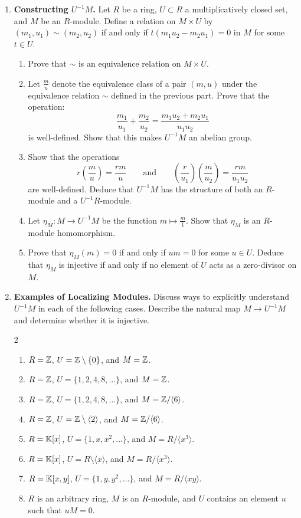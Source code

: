 \documentclass[12pt,reqno]{amsart}
\begin{document}
\begin{enumerate}[leftmargin=*,resume]

\item \textbf{Constructing $U^{-1}M$.} Let $R$ be a ring, $U \subset R$ a multiplicatively closed set, and $M$ be an $R$-module. Define a relation on $M\times U$ by $(m_{1},u_{1}) \sim (m_{2},u_{2})$ if and only if $t(m_1u_{2}-m_{2}u_{1})=0$ in $M$ for some $t\in U$. 
\begin{enumerate}
	\item Prove that $\sim$ is an equivalence relation on $M\times U$. 
	\item Let $\frac{m}{u}$ denote the equivalence class of a pair $(m,u)$ under the equivalence relation $\sim$ defined in the previous part. Prove that the operation:
	\[
\frac{m_1}{u_1}+\frac{m_2}{u_2} = \frac{m_1u_{2}+m_{2}u_{1}}{u_1u_2}
\]
	is well-defined. Show that this makes $U^{-1}M$ an abelian group.
	\item Show that the operations 
	\[
	r \left(\frac{m}{u}\right)=\frac{rm}{u} \quad \quad \text{and} \quad \quad \left(\frac{r}{u_1}\right)\left(\frac{m}{u_2}\right)=\frac{rm}{u_1u_2} 
	\]
	are well-defined. Deduce that $U^{-1}M$ has the structure of both an $R$-module and a $U^{-1}R$-module.
	\item Let $\eta_M:M\to U^{-1}M$ be the function $m\mapsto \frac{m}{1}$. Show that $\eta_M$ is an $R$-module homomorphism. 
	\item Prove that $\eta_M(m)=0$ if and only if $um=0$ for some $u\in U$. Deduce that $\eta_M$ is injective if and only if no element of $U$ acts as a zero-divisor on $M$.
\end{enumerate}

\item \textbf{Examples of Localizing Modules.} Discuss ways to explicitly understand $U^{-1}M$ in each of the following cases. Describe the natural map $M\to U^{-1}M$ and determine whether it is injective.
\begin{multicols}{2}
\begin{enumerate}
	\item $R=\mathbb{Z}$, $U=\mathbb{Z}\setminus\{0\}$, and $M=\mathbb{Z}$.
	\item $R=\mathbb{Z}$, $U=\{1,2,4,8,\ldots\}$, and $M=\mathbb{Z}$.
	\item $R=\mathbb{Z}$, $U=\{1,2,4,8,\ldots\}$, and $M=\mathbb{Z}/\langle 6\rangle$.
	\item $R=\mathbb{Z}$, $U=\mathbb{Z}\setminus \langle 2\rangle$, and $M=\mathbb{Z}/\langle 6\rangle$.
	\item $R=\mathbb{K}[x]$, $U=\{1,x,x^2,\ldots\}$, and $M=R/\langle x^3\rangle$.
	\item $R=\mathbb{K}[x]$, $U=R\setminus \langle x\rangle$, and $M=R/\langle x^3\rangle$.
	\item $R=\mathbb{K}[x,y]$, $U=\{1,y,y^2,\ldots\}$, and $M=R/\langle xy\rangle$.
	\item $R$ is an arbitrary ring, $M$ is an $R$-module, and $U$ contains an element $u$ such that $uM=0$.
\end{enumerate}
\end{multicols}


\end{enumerate}
\end{document}

